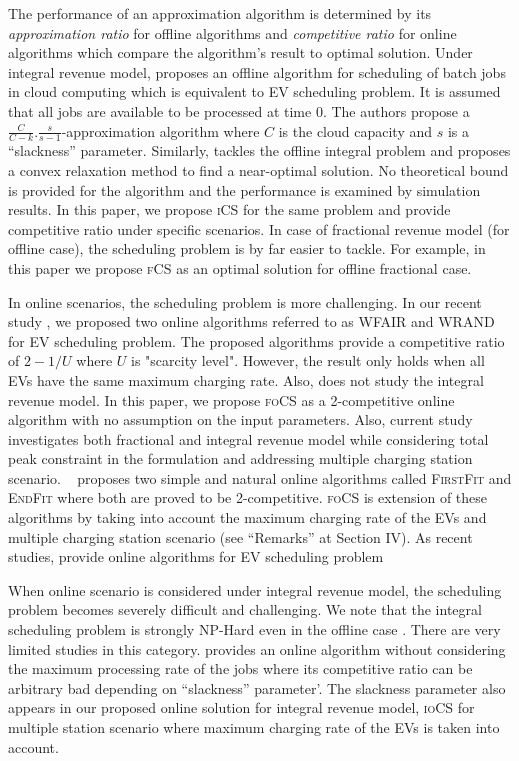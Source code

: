 \documentclass[journal]{IEEEtran}
\newcommand{\bt}[1]{{\color{blue}#1}}%
\newcommand{\bt}[1]{#1}
\newcommand{\ics}{\textsc{iCS}\xspace}
\newcommand{\fcs}{\textsc{fCS}\xspace}
\newcommand{\focs}{\textsc{foCS}\xspace}
\newcommand{\iocs}{\textsc{ioCS}\xspace}
\begin{document}
\bt{
The performance of an approximation algorithm is determined by its \emph{approximation ratio} for offline 
algorithms and \emph{competitive ratio} for online algorithms which compare the algorithm's result to optimal solution. 
Under integral revenue model, \cite{jain2015near} proposes an offline algorithm for scheduling of batch jobs in cloud computing which is equivalent to EV scheduling problem. It is assumed that all jobs are available to be processed at time 0. The authors propose a $\frac{C}{C-k}.\frac{s}{s-1}$-approximation algorithm where $C$ is the cloud capacity and $s$ is a ``slackness'' parameter. 
Similarly, \cite{yao2016real} tackles the offline integral problem and proposes a convex relaxation method to find a near-optimal solution. No theoretical bound is provided for the algorithm and the performance is examined by simulation results. In this paper, we propose \ics for the same problem and provide competitive ratio under specific scenarios. 
In case of fractional revenue model (for offline case), the scheduling problem is by far easier to tackle. For example, in this paper we propose \fcs as an optimal solution for offline fractional case. 

In online scenarios, the scheduling problem is more challenging. In our recent study \cite{alinia2018competitive}, 
we proposed two online algorithms referred to as WFAIR and WRAND for EV scheduling problem. The proposed algorithms provide a competitive ratio of $2-1/U$ where $U$ is "scarcity level". However, \cite{alinia2018competitive} the result only holds when all EVs have the same maximum charging rate. Also, \cite{alinia2018competitive} does not study the integral revenue model. In this paper, we propose \focs as a 2-competitive online algorithm with no assumption on the input parameters. Also, current study investigates both fractional and integral revenue model while considering total peak constraint in the formulation and addressing multiple charging station scenario. 
~\cite{firstfit} proposes two simple and natural online algorithms called \textsc{FirstFit} and \textsc{EndFit} where both are proved to be 2-competitive. \focs is extension of these algorithms by taking into account the maximum charging rate of the EVs and multiple charging station scenario (see ``Remarks'' at Section IV).
As recent studies, \cite{zheng2016online,deng2016whether} provide online algorithms for EV scheduling problem 

When online scenario is considered under integral revenue model, the scheduling problem becomes severely difficult and challenging. We note that the integral scheduling problem is strongly NP-Hard even in the offline case \cite{de2018complexity}. There are very limited studies in this category. \cite{lucier2013efficient} provides an online algorithm without considering the maximum processing rate of the jobs where its competitive ratio can be arbitrary bad depending on ``slackness'' parameter'. The slackness parameter also appears in our proposed online solution for integral revenue model, \iocs for multiple station scenario where maximum charging rate of the EVs is taken into account.
}
\end{document}
